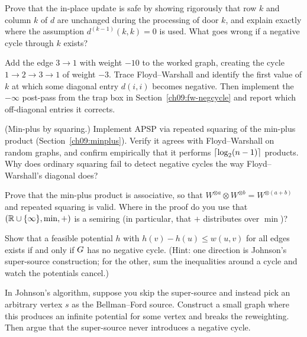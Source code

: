 \begin{exercise}
Prove that the in-place update is safe by showing rigorously that row $k$ and column $k$ of $d$ are
unchanged during the processing of door $k$, and explain exactly where the assumption $d^{(k-1)}(k,k)=0$
is used. What goes wrong if a negative cycle through $k$ exists?
\end{exercise}

\begin{exercise}
Add the edge $3\to1$ with weight $-10$ to the worked graph, creating the cycle $1\to2\to3\to1$ of weight
$-3$. Trace Floyd--Warshall and identify the first value of $k$ at which some diagonal entry $d(i,i)$
becomes negative. Then implement the $-\infty$ post-pass from the trap box in
Section~\ref{ch09:fw-negcycle} and report which off-diagonal entries it corrects.
\end{exercise}

\begin{exercise}
(Min-plus by squaring.) Implement APSP via repeated squaring of the min-plus product
(Section~\ref{ch09:minplus}). Verify it agrees with Floyd--Warshall on random graphs, and confirm
empirically that it performs $\lceil\log_2(n-1)\rceil$ products. Why does ordinary squaring fail to detect
negative cycles the way Floyd--Warshall's diagonal does?
\end{exercise}

\begin{exercise}
Prove that the min-plus product is associative, so that $W^{\otimes a}\otimes W^{\otimes b}=W^{\otimes(a+b)}$
and repeated squaring is valid. Where in the proof do you use that $(\mathbb{R}\cup\{\infty\},\min,+)$ is a
semiring (in particular, that $+$ distributes over $\min$)?
\end{exercise}

\begin{exercise}
Show that a feasible potential $h$ with $h(v)-h(u)\le w(u,v)$ for all edges exists if and only if $G$
has no negative cycle. (Hint: one direction is Johnson's super-source construction; for the other, sum
the inequalities around a cycle and watch the potentials cancel.)
\end{exercise}

\begin{exercise}
In Johnson's algorithm, suppose you skip the super-source and instead pick an arbitrary vertex $s$ as the
Bellman--Ford source. Construct a small graph where this produces an infinite potential for some vertex
and breaks the reweighting. Then argue that the super-source never introduces a negative cycle.
\end{exercise}

